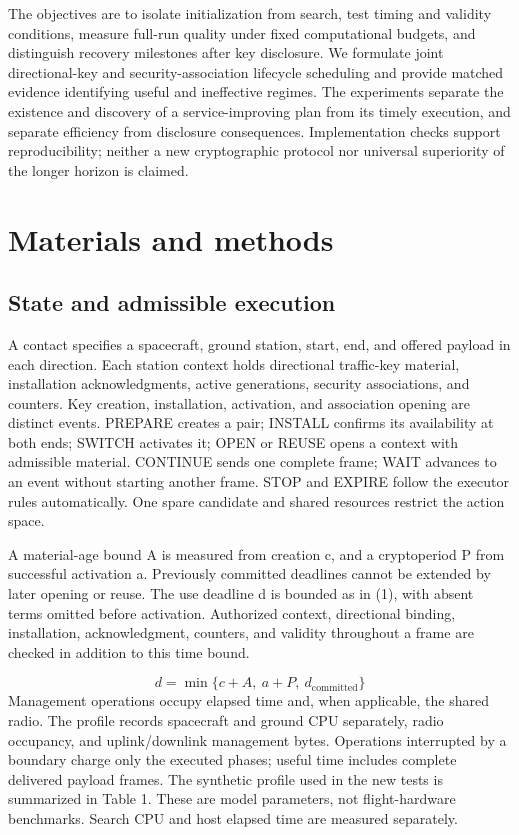 \documentclass[12pt,a4paper]{article}
\begin{document}
The objectives are to isolate initialization from search, test timing and validity conditions, measure full-run quality under fixed computational budgets, and distinguish recovery milestones after key disclosure. We formulate joint directional-key and security-association lifecycle scheduling and provide matched evidence identifying useful and ineffective regimes. The experiments separate the existence and discovery of a service-improving plan from its timely execution, and separate efficiency from disclosure consequences. Implementation checks support reproducibility; neither a new cryptographic protocol nor universal superiority of the longer horizon is claimed.

\section*{Materials and methods}
\subsection*{State and admissible execution}
A contact specifies a spacecraft, ground station, start, end, and offered payload in each direction. Each station context holds directional traffic-key material, installation acknowledgments, active generations, security associations, and counters. Key creation, installation, activation, and association opening are distinct events. PREPARE creates a pair; INSTALL confirms its availability at both ends; SWITCH activates it; OPEN or REUSE opens a context with admissible material. CONTINUE sends one complete frame; WAIT advances to an event without starting another frame. STOP and EXPIRE follow the executor rules automatically. One spare candidate and shared resources restrict the action space.

A material-age bound A is measured from creation c, and a cryptoperiod P from successful activation a. Previously committed deadlines cannot be extended by later opening or reuse. The use deadline d is bounded as in (1), with absent terms omitted before activation. Authorized context, directional binding, installation, acknowledgment, counters, and validity throughout a frame are checked in addition to this time bound.

\begin{equation}d=\min\{c+A,\ a+P,\ d_{\mathrm{committed}}\}\tag{1}\end{equation}
Management operations occupy elapsed time and, when applicable, the shared radio. The profile records spacecraft and ground CPU separately, radio occupancy, and uplink/downlink management bytes. Operations interrupted by a boundary charge only the executed phases; useful time includes complete delivered payload frames. The synthetic profile used in the new tests is summarized in Table 1. These are model parameters, not flight-hardware benchmarks. Search CPU and host elapsed time are measured separately.
\end{document}
